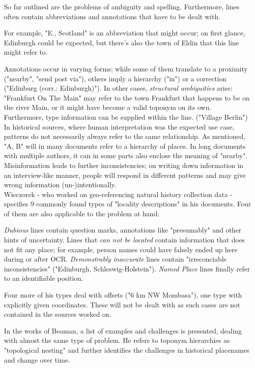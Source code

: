 \documentclass[11pt]{article}
\begin{document}
So far outlined are the problems of ambiguity and spelling. Furthermore, lines often contain abbreviations and annotations that have to be dealt with.

For example, "E., Scotland" is an abbreviation that might occur; on first glance, Edinburgh could be expected, but there's also the town of Eldin that this line might refer to.

Annotations occur in varying forms; while some of them translate to a proximity ("nearby", "send post via"), others imply a hierarchy ("in") or a correction ("Edinburg (corr.: Edinburgh)"). In other cases, \emph{structural ambiguities}\cite{overell11}\cite{wacholder97} arise: "Frankfurt On The Main" may refer to the town Frankfurt that happens to be on the river Main, or it might have become a valid toponym on its own. Furthermore, type information can be supplied within the line. ("Village Berlin")\\

In historical sources, where human interpretation was the expected use case, patterns do not necessarily always refer to the same relationship. As mentioned, "A, B" will in many documents refer to a hierarchy of places. In long documents with multiple authors, it can in some parts also enclose the meaning of "nearby". Misinformation leads to further inconsistencies; on writing down information in an interview-like manner, people will respond in different patterns and may give wrong information (un-)intentionally.\\

Wieczorek - who worked on geo-referencing natural history collection data - specifies 9 commonly found types of "locality descriptions" in his documents. \cite{wieczorek04} Four of them are also applicable to the problem at hand:

\emph{Dubious} lines contain question marks, annotations like "presumably" and other hints of uncertainty. Lines that \emph{can not be located} contain information that does not fit any place; for example, person names could have falsely ended up here during or after OCR. \emph{Demonstrably inaccurate} lines contain "irreconciable inconsistencies" ("Edinburgh, Schleswig-Holstein"). \emph{Named Place} lines finally refer to an identifiable position.

Four more of his types deal with offsets ("6 km NW Mombasa"), one type with explicitly given coordinates. These will not be dealt with as such cases are not contained in the sources worked on.

In the works of Beaman, a list of examples and challenges is presented, dealing with almost the same type of problem. He refers to toponym hierarchies as "topological nesting" and further identifies the challenges in historical placenames and change over time. \cite[p. 48]{beaman03}\\
\end{document}
